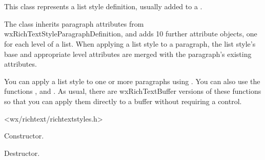 \section{}\label{wxrichtextliststyledefinition}

This class represents a list style definition, usually added to a .

The class inherits paragraph attributes from wxRichTextStyleParagraphDefinition, and adds 10 further attribute objects, one for each level of a list.
When applying a list style to a paragraph, the list style's base and appropriate level attributes are merged with the
paragraph's existing attributes.

You can apply a list style to one or more paragraphs using . You
can also use the functions ,  and 
. As usual, there are wxRichTextBuffer versions of these functions
so that you can apply them directly to a buffer without requiring a control.




<wx/richtext/richtextstyles.h>



\label{wxrichtextliststyledefinitionwxrichtextliststyledefinition}


Constructor.

\label{wxrichtextliststyledefinitiondtor}


Destructor.

\label{wxrichtextliststyledefinitioncombinewithparagraphstyle}


